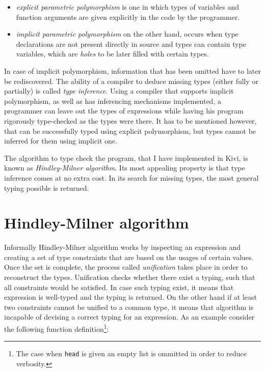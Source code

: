 \documentclass[12pt,a4paper]{report}
\begin{document}
\begin{itemize}
  \item \textit{explicit parametric polymorphism} is one in which types of
    variables and function arguments are given explicitly in the code by the
    programmer.
  \item \textit{implicit parametric polymorphism} on the other hand, occurs
    when type declarations are not present directly in source and types can
    contain type variables, which are \textit{holes} to be later filled with certain
    types.
\end{itemize}

In case of implicit polymorphism, information that has been omitted have to
later be rediscovered. The ability of a compiler to deduce missing types
(either fully or partially) is called \textit{type inference}. Using a compiler
that supports implicit polymorphism, as well as has inferencing mechanisms
implemented, a programmer can leave out the types of expressions while having
his program rigorously type-checked as the types were there. It has to be
mentioned however, that can be successfully typed using explicit polymorphism,
but types cannot be inferred for them using implicit one.

The algorithm to type check the program, that I have implemented in Kivi, is
known as \textit{Hindley-Milner algorithm}. Its most appealing property is that
type inference comes at no extra cost. In its search for missing types, the
most general typing possible is returned.

\section{Hindley-Milner algorithm}
Informally Hindley-Milner algorithm works by inspecting an expression and
creating a set of type constraints that are based on the usages of certain
values. Once the set is complete, the process called \textit{unification} takes
place in order to reconstruct the types. Unification checks whether there exist
a typing, such that all constraints would be satisfied. In case such typing
exist, it means that expression is well-typed and the typing is returned.
On the other hand if at least two constraints cannot be unified to a common
type, it means that algorithm is incapable of devising a correct typing for an
expression. As an example consider the following function
definition\footnote{The case when \texttt{head} is given an empty list is
ommitted in order to reduce verbosity.}:
\end{document}
